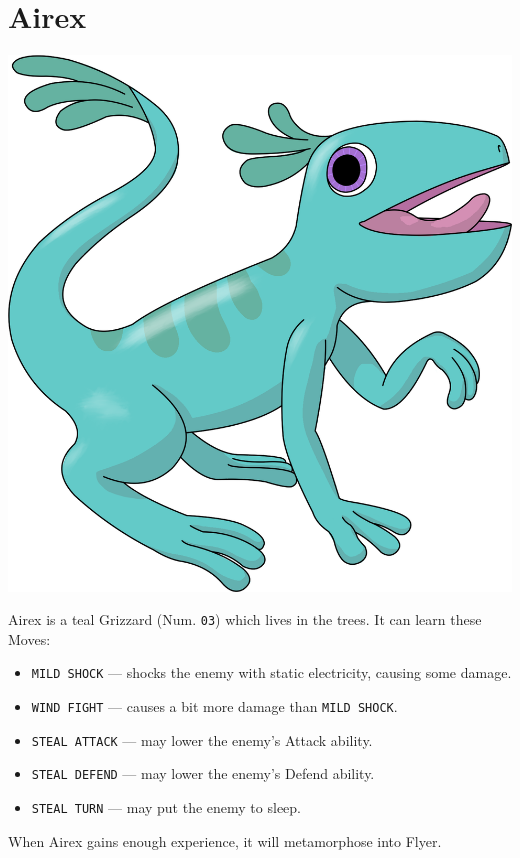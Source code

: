 \documentclass[9pt,twocolumn,openany,article]{memoir}
\newenvironment{ritemize}{\begin{itemize}\raggedright}{\end{itemize}}
\begin{document}
\ifdefined\DEMO\else

\pagebreak

\section{Airex}

\begin{center}
  \includegraphics[width=.8\columnwidth]{../Manual/Airex.png}
\end{center}

\noindent{}Airex is  a teal Grizzard  (Num. \texttt{03}) which  lives in
the trees. It can learn these Moves:

\begin{ritemize}
\item \texttt{MILD SHOCK} --- shocks  the enemy with static electricity,
  causing some damage.
\item \texttt{WIND FIGHT} --- causes a bit more damage than \texttt{MILD SHOCK}.
\item \texttt{STEAL ATTACK} --- may lower the enemy's Attack ability.
\item \texttt{STEAL DEFEND} --- may lower the enemy's Defend ability.
\item \texttt{STEAL TURN} --- may put the enemy to sleep.
\end{ritemize}

When Airex gains enough experience, it will metamorphose into Flyer.

\fi
\end{document}
